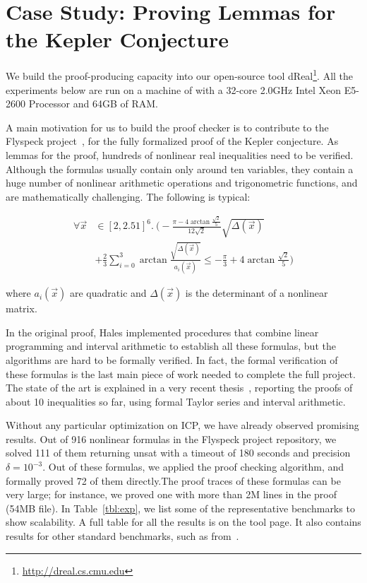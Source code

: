 \section{Case Study: Proving Lemmas for the Kepler Conjecture}\label{kepler}

We build the proof-producing capacity into our open-source tool {\sf
  dReal}\footnote{ \url{http://dreal.cs.cmu.edu} }. All the
experiments below are run on a machine of with a 32-core 2.0GHz Intel
Xeon E5-2600 Processor and 64GB of RAM.



A main motivation for us to build the proof checker is to contribute
to the Flyspeck project~\cite{DBLP:conf/dagstuhl/Hales05}, for the
fully formalized proof of the Kepler conjecture. As lemmas for the
proof, hundreds of nonlinear real inequalities need to be verified.
Although the formulas usually contain only around ten variables, they
contain a huge number of nonlinear arithmetic operations and
trigonometric functions, and are mathematically challenging. The
following is typical:

\begin{align*}
\forall \vec x&\in [2, 2.51]^6.\ \Big( -\frac{\pi-4\arctan\frac{\sqrt
2}{5}}{12\sqrt2}\sqrt{\Delta(\vec x)}\\
&+\frac{2}{3}\sum_{i=0}^3\arctan\frac{\sqrt{\Delta(\vec x)}}{a_i(\vec x)}\leq
-\frac{\pi}{3}+4\arctan\frac{\sqrt 2}{5}\Big)
\end{align*}

where $a_i(\vec x)$ are quadratic and $\Delta(\vec x)$ is the
determinant of a nonlinear matrix.

In the original proof, Hales implemented procedures that combine
linear programming and interval arithmetic to establish all these
formulas, but the algorithms are hard to be formally verified. In
fact, the formal verification of these formulas is the last main piece
of work needed to complete the full project. The state of the art is
explained in a very recent thesis~\cite{keplerthesis}, reporting the
proofs of about 10 inequalities so far, using formal Taylor series and
interval arithmetic.

Without any particular optimization on ICP, we have already observed
promising results. Out of 916 nonlinear formulas in the Flyspeck
project repository, we solved 111 of them returning {\sf unsat} with a
timeout of 180 seconds and precision $\delta=10^{-3}$. Out of these
formulas, we applied the proof checking algorithm, and formally proved
72 of them directly.The proof traces of these formulas can be very
large; for instance, we proved one with more than 2M lines in the
proof (54MB file). In Table~\ref{tbl:exp}, we list some of the
representative benchmarks to show scalability. A full table for all
the results is on the tool page. It also contains results for other
standard benchmarks, such as from~\cite{DBLP:conf/cade/JovanovicM12}.

